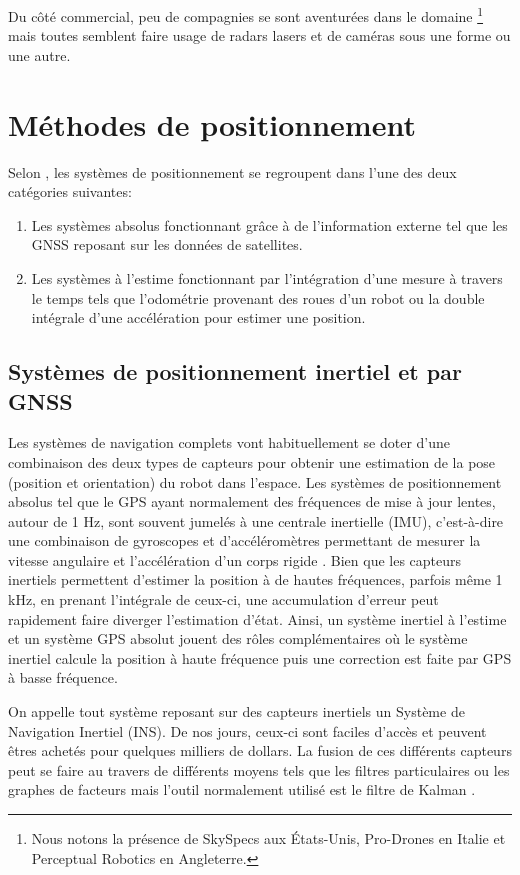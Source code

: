 Du côté commercial, peu de compagnies se sont aventurées dans le domaine \footnote{Nous notons la présence de SkySpecs aux États-Unis, Pro-Drones en Italie et Perceptual Robotics en Angleterre.} mais toutes semblent faire usage de radars lasers et de caméras sous une forme ou une autre.

\section{Méthodes de positionnement}\label{subsec:positionnement}

Selon \citep{Borenstein1997}, les systèmes de positionnement se regroupent dans l'une des deux catégories suivantes:
\begin{enumerate}
  \item Les systèmes absolus fonctionnant grâce à de l'information externe tel que les GNSS reposant sur les données de satellites.
  \item Les systèmes à l'estime fonctionnant par l'intégration d'une mesure à travers le temps tels que l'odométrie provenant des roues d'un robot ou la double intégrale d'une accélération pour estimer une position.
\end{enumerate}

\subsection{Systèmes de positionnement inertiel et par GNSS}

Les systèmes de navigation complets vont habituellement se doter d'une combinaison des deux types de capteurs pour obtenir une estimation de la pose (position et orientation) du robot dans l'espace. Les systèmes de positionnement absolus tel que le GPS ayant normalement des fréquences de mise à jour lentes, autour de 1 Hz, sont souvent jumelés à une centrale inertielle (IMU), c'est-à-dire une combinaison de gyroscopes et d'accéléromètres permettant de mesurer la vitesse angulaire et l'accélération d'un corps rigide \citep{Noureldin2013}. Bien que les capteurs inertiels permettent d'estimer la position à de hautes fréquences, parfois même 1 kHz, en prenant l'intégrale de ceux-ci, une accumulation d'erreur peut rapidement faire diverger l'estimation d'état. Ainsi, un système inertiel à l'estime et un système GPS absolut jouent des rôles complémentaires où le système inertiel calcule la position à haute fréquence puis une correction est faite par GPS à basse fréquence.

On appelle tout système reposant sur des capteurs inertiels un Système de Navigation Inertiel (INS). De nos jours, ceux-ci sont faciles d'accès et peuvent êtres achetés pour quelques milliers de dollars. La fusion de ces différents capteurs peut se faire au travers de différents moyens tels que les filtres particulaires \citep{Carvalho1997} ou les graphes de facteurs \citep{Indelman2012} mais l'outil normalement utilisé est le filtre de Kalman \citep{Noureldin2013}.

